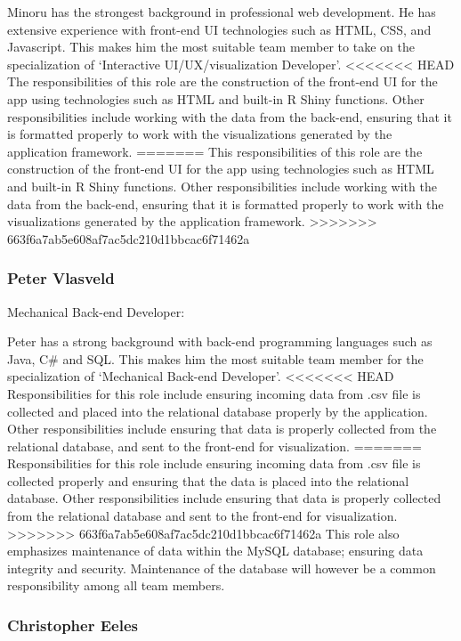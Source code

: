 \documentclass[10pt,twocolumn,letterpaper]{article}
\begin{document}
		Minoru has the strongest background in professional web development.
		He has extensive experience with front-end UI technologies such as HTML, CSS, and Javascript.
		This makes him the most suitable team member to take on the specialization of `Interactive UI/UX/visualization Developer'.
<<<<<<< HEAD
		The responsibilities of this role are the construction of the front-end UI for the app using technologies such as HTML and built-in R Shiny functions.
		Other responsibilities include working with the data from the back-end, ensuring that it is formatted properly to work with the visualizations generated 
		by the application framework. 
=======
		This responsibilities of this role are the construction of the front-end UI for the app using technologies such as HTML and built-in R Shiny functions.
		Other responsibilities include working with the data from the back-end, ensuring that it is formatted properly to work with the visualizations generated
		by the application framework.
>>>>>>> 663f6a7ab5e608af7ac5dc210d1bbcac6f71462a

                \subsubsection*{Peter Vlasveld}

                Mechanical Back-end Developer:

		Peter has a strong background with back-end programming languages such as Java, C# and SQL.
		This makes him the most suitable team member for the specialization of `Mechanical Back-end Developer'.
<<<<<<< HEAD
		Responsibilities for this role include ensuring incoming data from .csv file is collected and placed into 
		the relational database properly by the application.
		Other responsibilities include ensuring that data is properly collected from the relational database, and sent to the front-end for visualization.
=======
		Responsibilities for this role include ensuring incoming data from .csv file is collected properly and ensuring that the data is placed into
		the relational database.
		Other responsibilities include ensuring that data is properly collected from the relational database and sent to the front-end for visualization.
>>>>>>> 663f6a7ab5e608af7ac5dc210d1bbcac6f71462a
		This role also emphasizes maintenance of data within the MySQL database; ensuring data integrity and security.
		Maintenance of the database will however be a common responsibility among all team members.

                \subsubsection*{Christopher Eeles}
\end{document}
